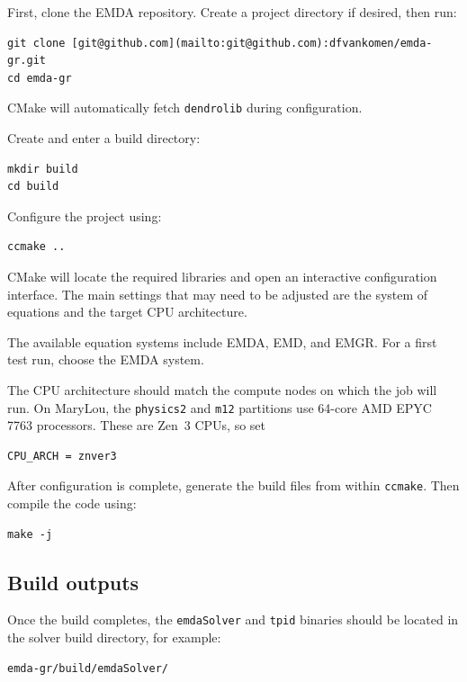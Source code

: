 First, clone the EMDA repository. Create a project directory if desired, then run:

\begin{verbatim}
git clone [git@github.com](mailto:git@github.com):dfvankomen/emda-gr.git
cd emda-gr
\end{verbatim}

CMake will automatically fetch \texttt{dendrolib} during configuration.

Create and enter a build directory:

\begin{verbatim}
mkdir build
cd build
\end{verbatim}

Configure the project using:

\begin{verbatim}
ccmake ..
\end{verbatim}

CMake will locate the required libraries and open an interactive configuration
interface. The main settings that may need to be adjusted are the system of
equations and the target CPU architecture.

The available equation systems include EMDA, EMD, and EMGR. For a first test
run, choose the EMDA system.

The CPU architecture should match the compute nodes on which the job will run.
On MaryLou, the \texttt{physics2} and \texttt{m12} partitions use 64-core AMD
EPYC 7763 processors. These are Zen~3 CPUs, so set

\begin{verbatim}
CPU_ARCH = znver3
\end{verbatim}

After configuration is complete, generate the build files from within
\texttt{ccmake}. Then compile the code using:

\begin{verbatim}
make -j
\end{verbatim}

\subsection{Build outputs}

Once the build completes, the \texttt{emdaSolver} and \texttt{tpid} binaries
should be located in the solver build directory, for example:

\begin{verbatim}
emda-gr/build/emdaSolver/
\end{verbatim}

